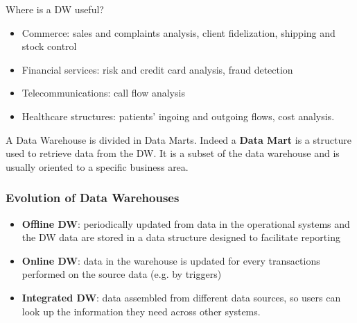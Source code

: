 \documentclass[10pt,a4paper]{article}
\begin{document}
Where is a DW useful?
\begin{itemize}
	\item Commerce: sales and complaints analysis, client fidelization, shipping and stock control
	\item Financial services: risk and credit card analysis, fraud detection
	\item Telecommunications: call flow analysis
	\item Healthcare structures: patients’ ingoing and outgoing flows, cost analysis.
\end{itemize}
A Data Warehouse is divided in Data Marts. Indeed a \textbf{Data Mart} is a structure used to retrieve data from the DW. It is a subset of the data warehouse and is usually oriented to a specific business area.
\subsubsection{Evolution of Data Warehouses}
\begin{itemize}
	\item \textbf{Offline DW}: periodically updated from data in the operational systems and the DW data are stored in a data structure designed to facilitate reporting
	\item \textbf{Online DW}: data in the warehouse is updated for every transactions performed on the source data (e.g. by triggers)
	\item \textbf{Integrated DW}: data assembled from different data sources, so users can look up the information they need across other systems.
\end{itemize}
\end{document}
